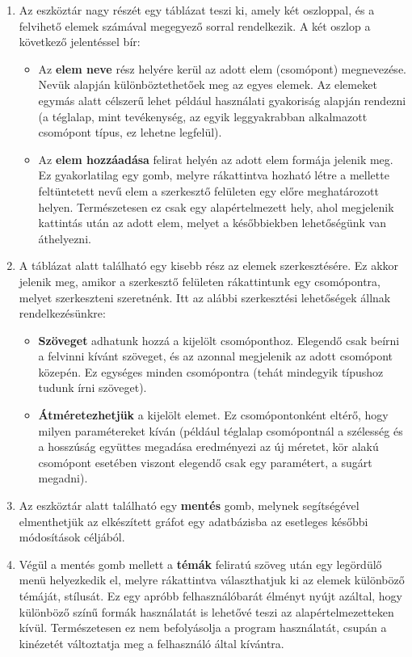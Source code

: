 \begin{enumerate}
\item Az eszköztár nagy részét egy táblázat teszi ki, amely két oszloppal, és a felvihető elemek számával megegyező sorral rendelkezik. A két oszlop a következő jelentéssel bír:

\begin{itemize}
\item Az \textbf{elem neve} rész helyére kerül az adott elem (csomópont) megnevezése. Nevük alapján különböztethetőek meg az egyes elemek. Az elemeket egymás alatt célszerű lehet például használati gyakoriság alapján rendezni (a téglalap, mint tevékenység, az egyik leggyakrabban alkalmazott csomópont típus, ez lehetne legfelül).
\item Az \textbf{elem hozzáadása} felirat helyén az adott elem formája jelenik meg. Ez gyakorlatilag egy gomb, melyre rákattintva hozható létre a mellette feltüntetett nevű elem a szerkesztő felületen egy előre meghatározott helyen. Természetesen ez csak egy alapértelmezett hely, ahol megjelenik kattintás után az adott elem, melyet a későbbiekben lehetőségünk van áthelyezni.
\end{itemize}

\item A táblázat alatt található egy kisebb rész az elemek szerkesztésére. Ez akkor jelenik meg, amikor a szerkesztő felületen rákattintunk egy csomópontra, melyet szerkeszteni szeretnénk. Itt az alábbi szerkesztési lehetőségek állnak rendelkezésünkre:

\begin{itemize}
\item \textbf{Szöveget} adhatunk hozzá a kijelölt csomóponthoz. Elegendő csak beírni a felvinni kívánt szöveget, és az azonnal megjelenik az adott csomópont közepén. Ez egységes minden csomópontra (tehát mindegyik típushoz tudunk írni szöveget).
\item \textbf{Átméretezhetjük} a kijelölt elemet. Ez csomópontonként eltérő, hogy milyen paramétereket kíván (például téglalap csomópontnál a szélesség és a hosszúság együttes megadása eredményezi az új méretet, kör alakú csomópont esetében viszont elegendő csak egy paramétert, a sugárt megadni).
\end{itemize}

\item Az eszköztár alatt található egy \textbf{mentés} gomb, melynek segítségével elmenthetjük az elkészített gráfot egy adatbázisba az esetleges későbbi módosítások céljából.

\item Végül a mentés gomb mellett a \textbf{témák} feliratú szöveg után egy legördülő menü helyezkedik el, melyre rákattintva választhatjuk ki az elemek különböző témáját, stílusát. Ez egy apróbb felhasználóbarát élményt nyújt azáltal, hogy különböző színű formák használatát is lehetővé teszi az alapértelmezetteken kívül. Természetesen ez nem befolyásolja a program használatát, csupán a kinézetét változtatja meg a felhasználó által kívántra.
\end{enumerate}

